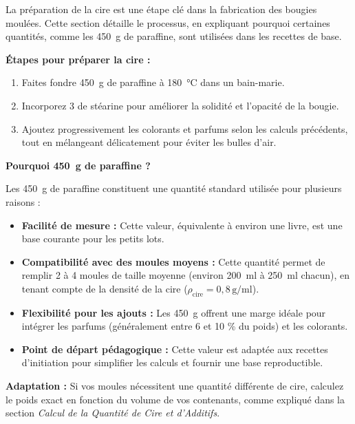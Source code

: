 \documentclass[11pt,fleqn,onecolumn,oneside]{book}
\begin{document}
La préparation de la cire est une étape clé dans la fabrication des bougies moulées. Cette section détaille le processus, en expliquant pourquoi certaines quantités, comme les \SI{450}{\gram} de paraffine, sont utilisées dans les recettes de base.

\begin{exercise}
\textbf{Étapes pour préparer la cire :}
\begin{enumerate}
    \item Faites fondre \SI{450}{\gram} de paraffine à \SI{180}{\degreeCelsius} dans un bain-marie.
    \item Incorporez \SI{3}{\cuil} de stéarine pour améliorer la solidité et l’opacité de la bougie.
    \item Ajoutez progressivement les colorants et parfums selon les calculs précédents, tout en mélangeant délicatement pour éviter les bulles d’air.
\end{enumerate}
\end{exercise}

\begin{remark}
\textbf{Pourquoi \SI{450}{\gram} de paraffine ?}

Les \SI{450}{\gram} de paraffine constituent une quantité standard utilisée pour plusieurs raisons :
\begin{itemize}
    \item \textbf{Facilité de mesure :} Cette valeur, équivalente à environ une livre, est une base courante pour les petits lots.
    \item \textbf{Compatibilité avec des moules moyens :} Cette quantité permet de remplir 2 à 4 moules de taille moyenne (environ \SI{200}{\milli\litre} à \SI{250}{\milli\litre} chacun), en tenant compte de la densité de la cire (\(\rho_{\text{cire}} = 0,8 \, \text{g/ml}\)).
    \item \textbf{Flexibilité pour les ajouts :} Les \SI{450}{\gram} offrent une marge idéale pour intégrer les parfums (généralement entre 6 et 10 \% du poids) et les colorants.
    \item \textbf{Point de départ pédagogique :} Cette valeur est adaptée aux recettes d'initiation pour simplifier les calculs et fournir une base reproductible.
\end{itemize}
\textbf{Adaptation :} Si vos moules nécessitent une quantité différente de cire, calculez le poids exact en fonction du volume de vos contenants, comme expliqué dans la section \textit{Calcul de la Quantité de Cire et d’Additifs}.
\end{remark}
\end{document}
